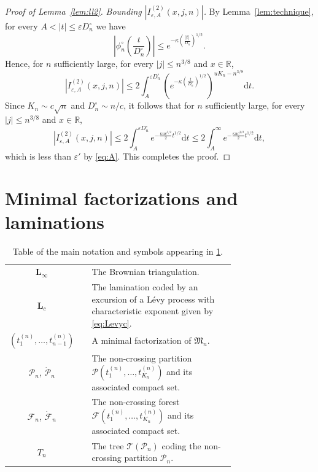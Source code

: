 \documentclass[AHL,XML,longabstracts,Unicode]{cedram}
\newcommand{\R}{\mathbb{R}}
\def\PPP{\mathcal P}
\def\FFF{\mathcal F}
\def\phicn{\phi^{\circ}_{n}}
\def\Dcn{D^{\circ}_{n}}
\renewcommand{\epsilon}{\varepsilon}
\begin{document}
\begin{proof}[Proof of Lemma~\ref{lem:ll2}]
 \emph{Bounding $|I^{(2)}_{\epsilon, {A} }(x,j,n)|$.}  By Lemma~\ref{lem:technique}, for every $A<|t| \leq \epsilon \Dcn$ we have \[  \left| \phicn \left(  \frac{t}{\Dcn} \right) \right|  \leq e^{-\kappa \left(  \frac{|t|}{\Dcn} \right) ^{1/2}}.\]
Hence, for $n$ sufficiently large, for every $|j| \leq n^{3/8}$ and $x \in \R$,
 \[ \left| I^{(2)}_{\epsilon,A}(x,j,n)  \right| \leq 2 \int_{A}^{\epsilon \Dcn}\left( e^{-\kappa  \left(  \frac{t}{\Dcn} \right) ^{1/2}} \right) ^{ uK_{n}  -n^{3/8}} \mathrm{d}t .\]
 Since $K_{n} \sim c \sqrt{n}$ and $ \Dcn\sim  n /c$, it follows that for $n$ sufficiently large, for every $|j| \leq n^{3/8}$ and $x \in \R$,
  \[ \left| I^{(2)}_{\epsilon,A}(x,j,n) \right| \leq 2 \int_{A}^{\epsilon \Dcn}  e^{- \frac{\kappa u  c^{3/2}}{2} t^{1/2}} \mathrm{d}t  \leq 2 \int_{A}^{\infty} e^{- \frac{\kappa u c^{3/2}}{2} t^{1/2}} \mathrm{d}t,\]
  which is less than $\epsilon'$ by \eqref{eq:A}.   This completes the proof.
  \end{proof}







\section{Minimal factorizations and  laminations}
\label{sec:lam}


\begin{table}[htbp]\caption{Table of the main notation and symbols appearing in \cref{sec:lam}.}
\centering
\begin{tabular}{c c p{0.73 \linewidth} }
\toprule
$\mathbf{L}_{\infty} $ & & The Brownian triangulation. \\
$\mathbf{L}_{c} $ && The lamination coded by an excursion of a L\'evy process with characteristic exponent given by \eqref{eq:Levyc}.\\
$(t_{1}^{(n)}, \ldots, t_{n-1}^{(n)})$  && A minimal factorization of $\mathfrak{M}_{n}$.\\
$ \PPP_{n}$, $ \dot{\PPP}_{n}$  && The non-crossing partition $ \PPP(  t_{1}^{(n)}, \ldots, t_{K_{n}}^{(n)})$ and its associated compact set. \\
$ \FFF_{n}$, $\dot{ \FFF}_{n}$&&  The non-crossing forest $ \FFF(  t_{1}^{(n)}, \ldots, t_{K_{n}}^{(n)})$ and its associated compact set.\\
$T_{n}$   &&  The tree $ \mathcal{T}(  \PPP_{n})$   coding the non-crossing partition $ \PPP_{n}$.\\
\bottomrule
\end{tabular}
\label{tab:seclam}
\end{table}
\end{document}
